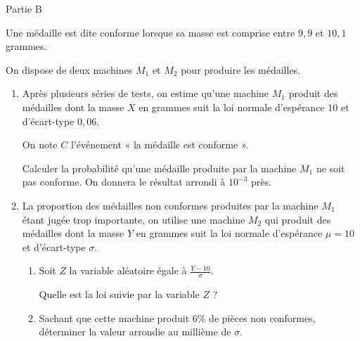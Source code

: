 \begin{h3}Partie B\end{h3}
Une médaille est dite conforme lorsque sa masse est comprise entre $9,9$ et $10,1$ grammes.
\par
On dispose de deux machines $M_1$ et $M_2$ pour produire les médailles.
\begin{enumerate}
     \item
     Après plusieurs séries de tests, on estime qu'une machine $M_1$ produit des médailles dont la masse $X$ en grammes suit la loi normale d'espérance $10$ et d'écart-type $0,06$.
     \par
     On note $C$ l'événement « la médaille est conforme ».
     \par
     Calculer la probabilité qu'une médaille produite par la machine $M_1$ ne soit pas conforme. On donnera le résultat arrondi à $10^{-3}$ près.
     \item
     La proportion des médailles non conformes produites par la machine $M_1$ étant jugée trop importante, on utilise une machine $M_2$ qui produit des médailles dont la masse $Y$ en grammes suit la loi normale d'espérance $\mu = 10$ et d'écart-type $\sigma$.
     \begin{enumerate}
          \item
          Soit $Z$ la variable aléatoire égale à $\frac{Y-10}{\sigma}$.
          \par
          Quelle est la loi suivie par la variable $Z$ ?
          \item
          Sachant que cette machine produit $6$\% de pièces non conformes, déterminer la valeur arrondie au millième de $\sigma$.
     \end{enumerate}
\end{enumerate}
